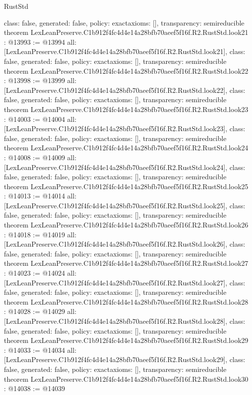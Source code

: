 \begin{lexlean}{RustStd}
\begin{coremodule}
{  class: false,
  generated: false,
  policy: exact{axioms: []},
  transparency: semireducible
}
theorem LexLeanPreserve.C1b912f4fc4d4e14a28bfb70aeef5f16f.R2.RustStd.look21 : @13993 := @13994 {
  all: [LexLeanPreserve.C1b912f4fc4d4e14a28bfb70aeef5f16f.R2.RustStd.look21],
  class: false,
  generated: false,
  policy: exact{axioms: []},
  transparency: semireducible
}
theorem LexLeanPreserve.C1b912f4fc4d4e14a28bfb70aeef5f16f.R2.RustStd.look22 : @13998 := @13999 {
  all: [LexLeanPreserve.C1b912f4fc4d4e14a28bfb70aeef5f16f.R2.RustStd.look22],
  class: false,
  generated: false,
  policy: exact{axioms: []},
  transparency: semireducible
}
theorem LexLeanPreserve.C1b912f4fc4d4e14a28bfb70aeef5f16f.R2.RustStd.look23 : @14003 := @14004 {
  all: [LexLeanPreserve.C1b912f4fc4d4e14a28bfb70aeef5f16f.R2.RustStd.look23],
  class: false,
  generated: false,
  policy: exact{axioms: []},
  transparency: semireducible
}
theorem LexLeanPreserve.C1b912f4fc4d4e14a28bfb70aeef5f16f.R2.RustStd.look24 : @14008 := @14009 {
  all: [LexLeanPreserve.C1b912f4fc4d4e14a28bfb70aeef5f16f.R2.RustStd.look24],
  class: false,
  generated: false,
  policy: exact{axioms: []},
  transparency: semireducible
}
theorem LexLeanPreserve.C1b912f4fc4d4e14a28bfb70aeef5f16f.R2.RustStd.look25 : @14013 := @14014 {
  all: [LexLeanPreserve.C1b912f4fc4d4e14a28bfb70aeef5f16f.R2.RustStd.look25],
  class: false,
  generated: false,
  policy: exact{axioms: []},
  transparency: semireducible
}
theorem LexLeanPreserve.C1b912f4fc4d4e14a28bfb70aeef5f16f.R2.RustStd.look26 : @14018 := @14019 {
  all: [LexLeanPreserve.C1b912f4fc4d4e14a28bfb70aeef5f16f.R2.RustStd.look26],
  class: false,
  generated: false,
  policy: exact{axioms: []},
  transparency: semireducible
}
theorem LexLeanPreserve.C1b912f4fc4d4e14a28bfb70aeef5f16f.R2.RustStd.look27 : @14023 := @14024 {
  all: [LexLeanPreserve.C1b912f4fc4d4e14a28bfb70aeef5f16f.R2.RustStd.look27],
  class: false,
  generated: false,
  policy: exact{axioms: []},
  transparency: semireducible
}
theorem LexLeanPreserve.C1b912f4fc4d4e14a28bfb70aeef5f16f.R2.RustStd.look28 : @14028 := @14029 {
  all: [LexLeanPreserve.C1b912f4fc4d4e14a28bfb70aeef5f16f.R2.RustStd.look28],
  class: false,
  generated: false,
  policy: exact{axioms: []},
  transparency: semireducible
}
theorem LexLeanPreserve.C1b912f4fc4d4e14a28bfb70aeef5f16f.R2.RustStd.look29 : @14033 := @14034 {
  all: [LexLeanPreserve.C1b912f4fc4d4e14a28bfb70aeef5f16f.R2.RustStd.look29],
  class: false,
  generated: false,
  policy: exact{axioms: []},
  transparency: semireducible
}
theorem LexLeanPreserve.C1b912f4fc4d4e14a28bfb70aeef5f16f.R2.RustStd.look30 : @14038 := @14039 {
}
\end{coremodule}
\end{lexlean}
